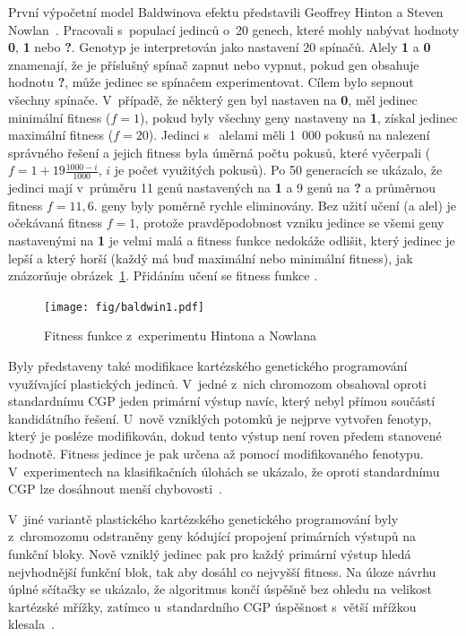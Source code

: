 První výpočetní model Baldwinova efektu představili Geoffrey Hinton a Steven Nowlan~\cite{HintonNowlan}. Pracovali s~populací jedinců o~20 genech, které mohly nabývat hodnoty \textbf{0}, \textbf{1} nebo \textbf{?}. Genotyp je interpretován jako nastavení 20 spínačů. Alely \textbf{1} a \textbf{0} znamenají, že je příslušný spínač zapnut nebo vypnut, pokud gen obsahuje hodnotu \textbf{?}, může jedinec se spínačem experimentovat. Cílem bylo sepnout všechny spínače. V~případě, že některý gen byl nastaven na \textbf{0}, měl jedinec minimální fitness ($f = 1$), pokud byly všechny geny nastaveny na \textbf{1}, získal jedinec maximální fitness ($f = 20$). Jedinci s~ alelami měli 1~000 pokusů na nalezení správného řešení a jejich fitness byla úměrná počtu pokusů, které vyčerpali ($f = 1 + 19 \frac{1000 - i}{1000}$, $i$ je počet využitých pokusů). Po 50 generacích se ukázalo, že jedinci mají v~průměru 11 genů nastavených na \textbf{1} a 9 genů na \textbf{?} a průměrnou fitness $f = 11,6$.  geny byly poměrně rychle eliminovány. Bez užití učení (a  alel) je očekávaná fitness $f = 1$, protože pravděpodobnost vzniku jedince se všemi geny nastavenými na \textbf{1} je velmi malá a fitness funkce nedokáže odlišit, který jedinec je lepší a který horší (každý má buď maximální nebo minimální fitness), jak znázorňuje obrázek~\ref{obrHintonNowlan}. Přidáním učení se fitness funkce .

\begin{figure}[htb]
    \centering\texttt{[image: fig/baldwin1.pdf]}
    \caption{Fitness funkce z~experimentu Hintona a Nowlana~\cite{HintonNowlan}}
    \label{obrHintonNowlan}
\end{figure}

Byly představeny také modifikace kartézského genetického programování využívající plastických jedinců.
V~jedné z~nich chromozom obsahoval oproti standardnímu CGP jeden primární výstup navíc, který nebyl přímou součástí kandidátního řešení. U~nově vzniklých potomků je nejprve vytvořen fenotyp, který je posléze modifikován, dokud tento výstup není roven předem stanovené hodnotě. Fitness jedince je pak určena až pomocí modifikovaného fenotypu. V~experimentech na klasifikačních úlohách se ukázalo, že oproti standardnímu CGP lze dosáhnout menší chybovosti~\cite{UllahPlasticCGP}.

V~jiné variantě plastického kartézského genetického programování byly z~chromozomu odstraněny geny kódující  propojení primárních výstupů na funkční bloky. Nově vzniklý jedinec pak pro každý primární výstup hledá nejvhodnější funkční blok, tak aby dosáhl co nejvyšší fitness. Na úloze návrhu úplné sčítačky se ukázalo, že algoritmus končí úspěšně bez ohledu na velikost kartézské mřížky, zatímco u~standardního CGP úspěšnost s~větší mřížkou klesala~\cite{KhatirPlasticCGP}.

